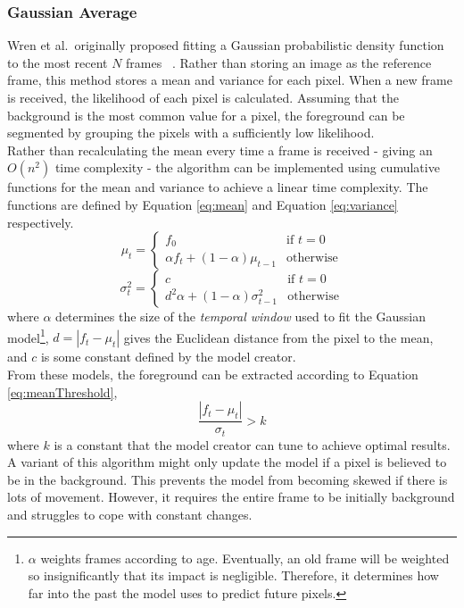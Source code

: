 \subsubsection{Gaussian Average}
\label{sec:gaussianAverage}
\indent \indent
Wren et al.\ originally proposed fitting a Gaussian probabilistic density function to the most recent $N$ frames ~\cite{Wren}. Rather than storing an image as the reference frame, this method stores a mean and variance for each pixel. When a new frame is received, the likelihood of each pixel is calculated. Assuming that the background is the most common value for a pixel, the foreground can be segmented by grouping the pixels with a sufficiently low likelihood.
\smallskip \\ \indent
Rather than recalculating the mean every time a frame is received - giving an $O(n^2)$ time complexity - the algorithm can be implemented using cumulative functions for the mean and variance to achieve a linear time complexity. The functions are defined by Equation \ref{eq:mean} and Equation \ref{eq:variance} respectively. 
\begin{equation}
    \label{eq:mean}
    \mu_t =
    \begin{cases}
        f_0 & \text{if $t = 0$} \\
        \alpha f_t + (1 - \alpha) \mu_{t-1} & \text{otherwise}
    \end{cases}
\end{equation}
\begin{equation}
    \label{eq:variance}
    \sigma^2_t =
    \begin{cases}
        c & \text{if $t = 0$} \\
        d^2 \alpha + (1 - \alpha) \sigma^2_{t-1} & \text{otherwise}
    \end{cases}
\end{equation}
where $\alpha$ determines the size of the \textit{temporal window} used to fit the Gaussian model\footnote{$\alpha$ weights frames according to age. Eventually, an old frame will be weighted so insignificantly that its impact is negligible. Therefore, it determines how far into the past the model uses to predict future pixels.}, $d = |f_t - \mu_t|$ gives the Euclidean distance from the pixel to the mean, and $c$ is some constant defined by the model creator. 
\smallskip \\ \indent
From these models, the foreground can be extracted according to Equation \ref{eq:meanThreshold},
\begin{equation}
    \label{eq:meanThreshold}
    \frac{|f_t - \mu_t|}{\sigma_t} > k
\end{equation}
where $k$ is a constant that the model creator can tune to achieve optimal results.
\smallskip \\ \indent
A variant of this algorithm might only update the model if a pixel is believed to be in the background. This prevents the model from becoming skewed if there is lots of movement. However, it requires the entire frame to be initially background and struggles to cope with constant changes.
